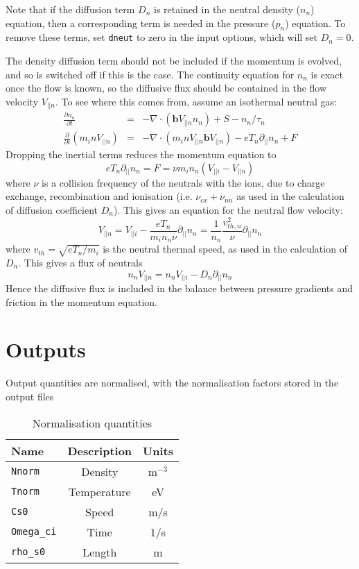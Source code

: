 \documentclass[12pt,a4paper]{article}
\newcommand{\bvec}{\mathbf{b}}
\begin{document}
Note that if the diffusion term $D_n$ is retained in the neutral density ($n_n$) equation, then a corresponding term is needed in
the pressure ($p_n$) equation.  To remove these terms, set \texttt{dneut} to zero in the input options, which will set $D_n = 0$.

The density diffusion term should not be included if the momentum is evolved, and so is switched off if this is the case.
The continuity equation for $n_n$ is exact once the flow is known, so the diffusive flux
should be contained in the flow velocity $V_{||n}$. To see where this comes from, assume an isothermal neutral gas:
\begin{eqnarray*}
  \frac{\partial n_n}{\partial t} &=& - \nabla\cdot\left( \bvec V_{||n} n_n\right) + S - n_n / \tau_n\\
  \frac{\partial}{\partial t}\left(m_i nV_{||n}\right) &=& -\nabla\cdot\left(m_inV_{||n}\bvec V_{||n}\right) - eT_n\partial_{||} n_n + F
\end{eqnarray*}
Dropping the inertial terms reduces the momentum equation to
\[
eT_n\partial_{||} n_n = F = \nu m_i n_n \left(V_{||i} - V_{||n}\right)
\]
where $\nu$ is a collision frequency of the neutrals with the ions, due to charge exchange, recombination and ionisation
(i.e. $\nu_{cx} + \nu_{nn}$ as used in the calculation of diffusion coefficient $D_n$).
This gives an equation for the neutral flow velocity:
\[
V_{||n} = V_{||i} - \frac{eT_n}{m_i n_n \nu}\partial_{||} n_n = \frac{1}{n_n}\frac{v_{th,n}^2}{\nu}\partial_{||} n_n 
\]
where $v_{th} = \sqrt{eT_n / m_i}$ is the neutral thermal speed, as used in the calculation of $D_n$. This gives a flux
of neutrals
\[
n_nV_{||n} = n_nV_{||i} - D_n\partial_{||} n_n
\]
Hence the diffusive flux is included in the balance between pressure gradients and friction in the momentum equation.

\section{Outputs}
\label{sec:output}

Output quantities are normalised, with the normalisation factors stored in the output files

\begin{table}[h]
\caption{Normalisation quantities}
\label{tab:normalisation}
\begin{center}
\begin{tabular}{l c c}
  Name & Description & Units \\
  \hline
  \texttt{Nnorm}  & Density  & m$^{-3}$\\
  \texttt{Tnorm}  & Temperature  & eV\\
  \texttt{Cs0}  & Speed  & m/s \\
  \texttt{Omega\_ci} & Time & 1/s \\
  \texttt{rho\_s0} & Length & m \\
  \hline
\end{tabular}
\end{center}
\end{table}
\end{document}
